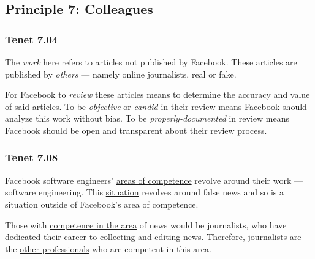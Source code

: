 
\subsection{Principle 7: Colleagues}

\subsubsection{Tenet 7.04}


\par The \emph{work} here refers to articles not published by Facebook. These articles are published by \emph{others} --- namely online journalists, real or fake.

\par For Facebook to \emph{review} these articles means to determine the accuracy and value of said articles. To be \emph{objective} or \emph{candid} in their review means Facebook should analyze this work without bias. To be \emph{properly-documented} in review means Facebook should be open and transparent about their review process. \cite{dictionary}


\subsubsection{Tenet 7.08}


\par Facebook software engineers' \ul{areas of competence} revolve around their work --- software engineering. This \ul{situation} revolves around false news and so is a situation outside of Facebook's area of competence.

\par Those with \ul{competence in the area} of news would be journalists, who have dedicated their career to collecting and editing news. \cite{dictionary} Therefore, journalists are the \ul{other professionals} who are competent in this area.

